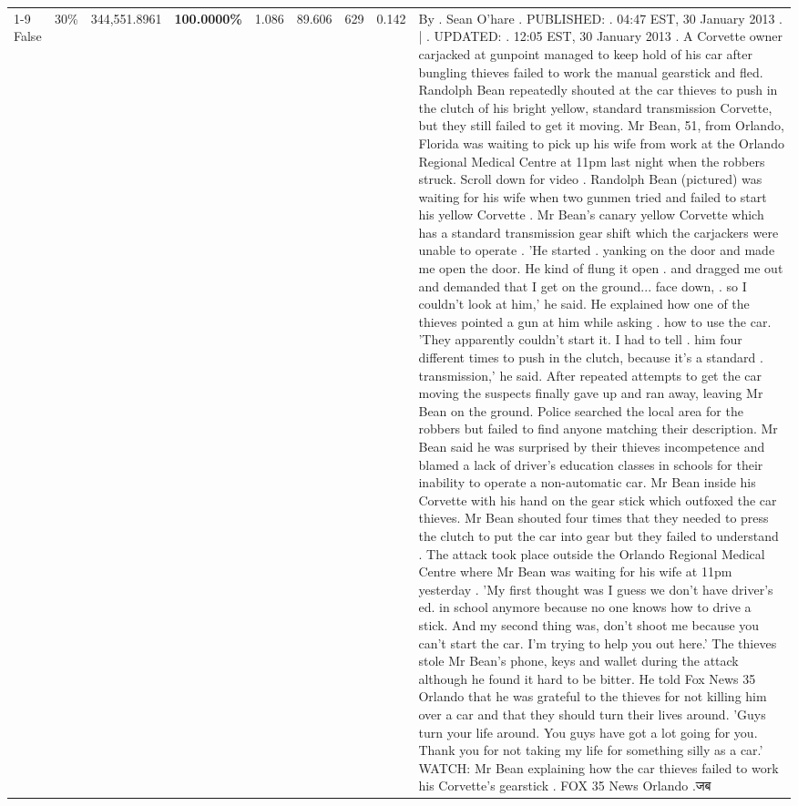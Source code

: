 \begin{table}[H]
\begin{tabular}{lllrlllll}
\cline{1-9} \cline{2-9}
False & 30\% & 344,551.8961 & \bfseries \color{red} 100.0000\% & 1.086 & 89.606 & 629 & 0.142 & By . Sean O'hare . PUBLISHED: . 04:47 EST, 30 January 2013 . | . UPDATED: . 12:05 EST, 30 January 2013 . A Corvette owner carjacked at gunpoint managed to keep hold of his car after bungling thieves failed to work the manual gearstick and fled. Randolph Bean repeatedly shouted at the car thieves to push in the clutch of his bright yellow, standard transmission Corvette, but they still failed to get it moving. Mr Bean, 51, from Orlando, Florida was waiting to pick up his wife from work at the Orlando Regional Medical Centre at 11pm last night when the robbers struck. Scroll down for video . Randolph Bean (pictured) was waiting for his wife when two gunmen tried and failed to start his yellow Corvette . Mr Bean's canary yellow Corvette which has a standard transmission gear shift which the carjackers were unable to operate . 'He started . yanking on the door and made me open the door. He kind of flung it open . and dragged me out and demanded that I get on the ground... face down, . so I couldn't look at him,' he said. He explained how one of the thieves pointed a gun at him while asking . how to use the car. 'They apparently couldn't start it. I had to tell . him four different times to push in the clutch, because it's a standard . transmission,' he said. After repeated attempts to get the car moving the suspects finally gave up and ran away, leaving Mr Bean on the ground. Police searched the local area for the robbers but failed to find anyone matching their description. Mr Bean said he was surprised by their thieves incompetence and blamed a lack of driver's education classes in schools for their inability to operate a non-automatic car. Mr Bean inside his Corvette with his hand on the gear stick which outfoxed the car thieves. Mr Bean shouted four times that they needed to press the clutch to put the car into gear but they failed to understand . The attack took place outside the Orlando Regional Medical Centre where Mr Bean was waiting for his wife at 11pm yesterday . 'My first thought was I guess we don't have driver's ed. in school anymore because no one knows how to drive a stick. And my second thing was, don't shoot me because you can't start the car. I'm trying to help you out here.' The thieves stole Mr Bean's phone, keys and wallet during the attack although he found it hard to be bitter. He told Fox News 35 Orlando that he was grateful to the thieves for not killing him over a car and that they should turn their lives around. 'Guys turn your life around. You guys have got a lot going for you. Thank you for not taking my life for something silly as a car.' WATCH: Mr Bean explaining how the car thieves failed to work his Corvette's gearstick . FOX 35 News Orlando .जब \\

\end{tabular}
\end{table}
